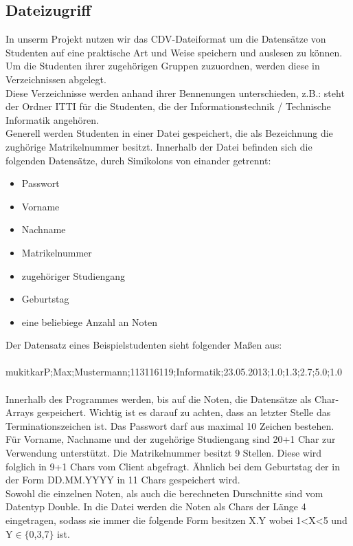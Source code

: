 \documentclass{scrartcl}
\begin{document}
	\subsection{Dateizugriff}
		In unserm Projekt nutzen wir das CDV-Dateiformat um die Datensätze von Studenten auf eine praktische Art und Weise speichern und auslesen zu können. Um die Studenten ihrer zugehörigen Gruppen zuzuordnen, werden diese in Verzeichnissen abgelegt.\\
		Diese Verzeichnisse werden anhand ihrer Bennenungen unterschieden, z.B.: steht der Ordner ITTI für die Studenten, die der Informationstechnik / Technische Informatik angehören.\\
		Generell werden Studenten in einer Datei gespeichert, die als Bezeichnung die zughörige Matrikelnummer besitzt. Innerhalb der Datei befinden sich die folgenden Datensätze, durch Simikolons von einander getrennt:\\
		\begin{itemize}
			\item Passwort
			\item Vorname
			\item Nachname
			\item Matrikelnummer
			\item zugehöriger Studiengang
			\item Geburtstag
			\item eine beliebiege Anzahl an Noten
		\end{itemize}
		Der Datensatz eines Beispielstudenten sieht folgender Maßen aus:\\
		 \\
		mukitkarP;Max;Mustermann;113116119;Informatik;23.05.2013;1.0;1.3;2.7;5.0;1.0\\
		 \\
		Innerhalb des Programmes werden, bis auf die Noten, die Datensätze als Char-Arrays gespeichert. Wichtig ist es darauf zu achten, dass an letzter Stelle das Terminationszeichen ist. Das Passwort darf aus maximal 10 Zeichen bestehen. Für Vorname, Nachname und der zugehörige Studiengang sind 20+1 Char zur Verwendung unterstützt. Die Matrikelnummer besitzt 9 Stellen. Diese wird folglich in 9+1 Chars vom Client abgefragt. Ähnlich bei dem Geburtstag der in der Form DD.MM.YYYY in 11 Chars gespeichert wird. \\
		Sowohl die einzelnen Noten, als auch die berechneten Durschnitte sind vom Datentyp Double. In die Datei werden die Noten als Chars der Länge 4 eingetragen, sodass sie immer die folgende Form besitzen X.Y wobei 1<X<5 und Y$\in \{$0,3,7$\}$ ist.\\
\end{document}
